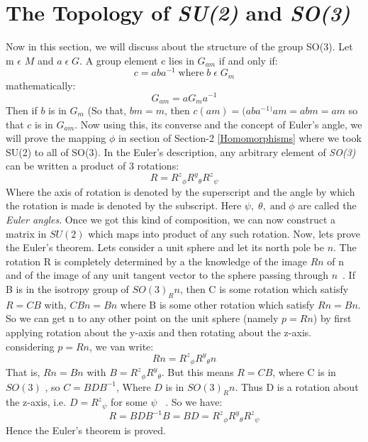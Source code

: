 \section{The Topology of \textit{SU(2)} and \textit{SO(3)}}

Now in this section, we will discuss about the structure of the group SO(3). Let m $\epsilon$ $M$ and $a \; \epsilon \;G$. A group element c lies in $G_{am}$ if and only if:
\begin{equation}
  c=aba^{-1}  \;\text{where}\; b \; \epsilon \; G_{m}
\end{equation}
mathematically:
\begin{equation}
    G_{am}=aG_{m}a^{-1}
\end{equation}
Then if $b$ is in $G_{m}$ (So that, $bm=m$, then $c(am)=(aba^{-1)}am=abm=am$ so that $c$ is in $G_{am}$. Now using this, its converse and the concept of Euler's angle, we will prove the mapping $\phi$ in section of Section-2 \ref{Homomorphisms} where we took SU(2) to all of SO(3). In the Euler's description, any arbitrary element of \textit{SO(3)} can be written a product of 3 rotations:
\begin{equation}
    R={R^{z}}_{\phi}{R^{y}}_{\theta}{R^{z}}_{\psi}
\end{equation}
Where the axis of rotation is denoted by the superscript and the angle by which the rotation is made is denoted by the subscript. Here $\psi,\;\theta,\; \text{and}\; \phi$ are called the \textit{Euler angles}. Once we got this kind of composition, we can now construct a matrix in $SU(2)$ which maps into product of any such rotation. Now, lets prove the Euler's theorem. Lets consider a unit sphere and let its north pole be $n$. The rotation R is completely determined by a the knowledge of the image $Rn$ of n and of the image of any unit tangent vector to the sphere passing through $n$~\cite{sternberg1995group}. 
If B is in the isotropy group of $SO(3)_R{n}$, then C is some rotation which satisfy $R=CB$ with, $CBn=Bn$ where B is some other rotation which satisfy $Rn=Bn$.  So we can get n to any other point on the unit sphere (namely $p=Rn$) by first applying rotation about the y-axis and then rotating about the z-axis. considering $p=Rn$, we van write:
\begin{equation}
    Rn={R^{z}}_{\phi}{R^{y}}_{\theta}n
\end{equation}
That is, $Rn=Bn$ with $B={R^{z}}_{\phi}{R^{y}}_{\theta}$. But this means $R=CB$, where C is in $SO(3)$
, so $C=BDB^{-1}$, Where $D$ is in $SO(3)_R{n}$. Thus D is a rotation about the z-axis, i.e. $D={R^{z}}_{\psi}$ for some $\psi$ ~\cite{sternberg1995group}. So we have:
\begin{equation}
  R=BDB^{-1}B=BD={R^{z}}_{\phi}{R^{y}}_{\theta}{R^{z}}_{\psi}  
\end{equation}
Hence the Euler's theorem is proved.

